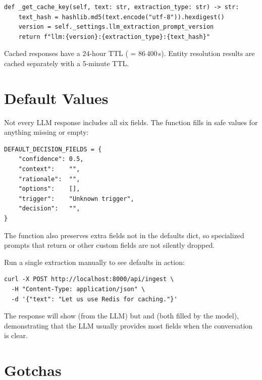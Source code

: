 \begin{lstlisting}[style=python, numbers=none, caption={The cache key generation method.}]
def _get_cache_key(self, text: str, extraction_type: str) -> str:
    text_hash = hashlib.md5(text.encode("utf-8")).hexdigest()
    version = self._settings.llm_extraction_prompt_version
    return f"llm:{version}:{extraction_type}:{text_hash}"
\end{lstlisting}

Cached responses have a 24-hour TTL ( =
86\,400\,s).  Entity resolution results are cached separately with a
5-minute TTL.


\section{Default Values}
\label{sec:default-values}

Not every LLM response includes all six fields.  The
 function fills in safe values for anything
missing or empty:

\begin{lstlisting}[style=python, caption={Default values for incomplete extraction results.}]
DEFAULT_DECISION_FIELDS = {
    "confidence": 0.5,
    "context":    "",
    "rationale":  "",
    "options":    [],
    "trigger":    "Unknown trigger",
    "decision":   "",
}
\end{lstlisting}

The function also preserves extra fields not in the defaults dict, so
specialized prompts that return  or other custom fields
are not silently dropped.

\begin{tryit}
Run a single extraction manually to see defaults in action:
\begin{lstlisting}[style=bash, numbers=none]
curl -X POST http://localhost:8000/api/ingest \
  -H "Content-Type: application/json" \
  -d '{"text": "Let us use Redis for caching."}'
\end{lstlisting}
The response will show \ic{confidence: 0.85} (from the LLM) but
\ic{context: ""} and  (both filled by the model),
demonstrating that the LLM usually provides most fields when the
conversation is clear.
\end{tryit}


\section{Gotchas}
\label{sec:extraction-gotchas}

